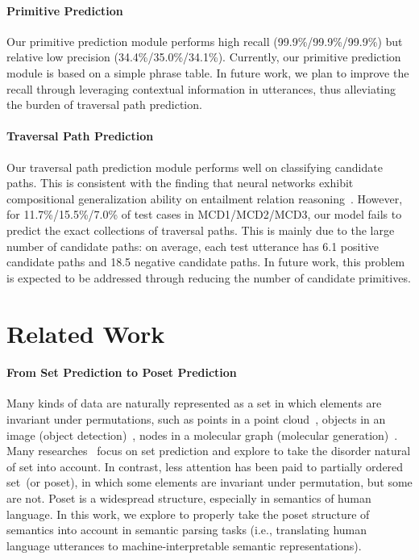 \documentclass{article}
\begin{document}
\paragraph{Primitive Prediction}
Our primitive prediction module performs high recall (99.9\%/99.9\%/99.9\%) but relative low precision (34.4\%/35.0\%/34.1\%).
Currently, our primitive prediction module is based on a simple phrase table.
In future work, we plan to improve the recall through leveraging contextual information in utterances, thus alleviating the burden of traversal path prediction.

\paragraph{Traversal Path Prediction}
Our traversal path prediction module performs well on classifying candidate paths.
This is consistent with the finding that neural networks exhibit compositional generalization ability on entailment relation reasoning~\citep{mul2019siamese}.
However, for 11.7\%/15.5\%/7.0\% of test cases in MCD1/MCD2/MCD3, our model fails to predict the exact collections of traversal paths.
This is mainly due to the large number of candidate paths: on average, each test utterance has 6.1 positive candidate paths and 18.5 negative candidate paths.
In future work, this problem is expected to be addressed through reducing the number of candidate primitives.













\section{Related Work}
\paragraph{From Set Prediction to Poset Prediction}
Many kinds of data are naturally represented as a set in which elements are invariant under permutations, such as points in a point cloud~\citep{achlioptas2017learning,fan2017point}, objects in an image (object detection)~\citep{rezatofighi2018deep,balles2019holographic}, nodes in a molecular graph (molecular generation)~\citep{balles2019holographic,simonovsky2018graphvae}.
Many researches~\citep{vinyals2015order,rezatofighi2018deep,zhang2019deep} focus on set prediction and explore to take the disorder natural of set into account. 
In contrast, less attention has been paid to partially ordered set~(or poset), in which some elements are invariant under permutation, but some are not.
Poset is a widespread structure, especially in semantics of human language.
In this work, we explore to properly take the poset structure of semantics into account in semantic parsing tasks (i.e., translating human language utterances to machine-interpretable semantic representations).
\end{document}
